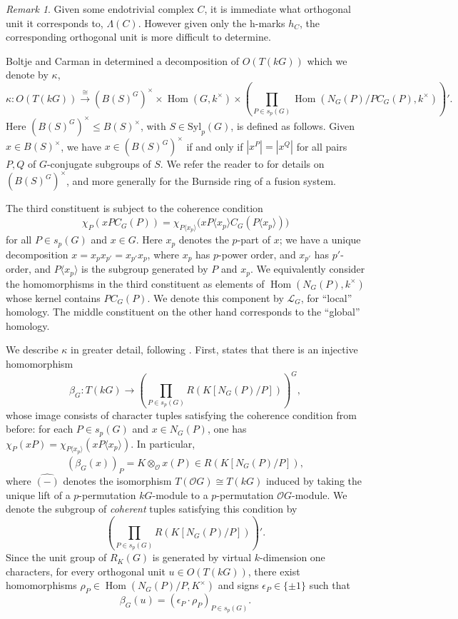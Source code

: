\documentclass[10pt,letterpaper, boxed, cm]{amsart}
\newcommand{\Hom}{\operatorname{Hom}}
\newcommand{\bigO}{\mathcal{O}}
\theoremstyle{remark}
\newtheorem{remark}[theorem]{Remark}
\theoremstyle{definition}
\begin{document}
	\begin{remark}\label{trivsourceringdecomp}
		Given some endotrivial complex $C$, it is immediate what orthogonal unit it corresponds to, $\Lambda(C)$. However given only the h-marks $h_C$, the corresponding orthogonal unit is more difficult to determine.

		Boltje and Carman in \cite{BC23} determined a decomposition of $O(T(kG))$ which we denote by $\kappa$, \[\kappa: O(T(kG)) \xrightarrow{\cong} (B(S)^G)^\times \times \Hom(G, k^\times) \times \left(\prod_{P \in s_p(G)} \Hom(N_G(P)/PC_G(P), k^\times)\right)'.\] Here $(B(S)^G)^\times \leq B(S)^\times$, with  $S \in \text{Syl}_p(G)$, is defined as follows. Given $x \in B(S)^\times$, we have $x \in (B(S)^G)^\times$ if and only if $|x^P| = |x^Q|$ for all pairs $P,Q$ of $G$-conjugate subgroups of $S$. We refer the reader to \cite{BaC19} for details on $(B(S)^G)^\times$, and more generally for the Burnside ring of a fusion system.

		The third constituent is subject to the coherence condition \[\chi_P(xPC_G(P)) = \chi_{P\langle x_p\rangle}\big(x P\langle x_p\rangle C_G(P\langle x_p\rangle)\big)\] for all $P \in s_p(G)$ and $x \in G$. Here $x_p$ denotes the $p$-part of $x$; we have a unique decomposition $x = x_px_{p'} = x_{p'}x_p$, where $x_p$ has $p$-power order, and $x_{p'}$ has $p'$-order, and $P\langle x_p\rangle$ is the subgroup generated by $P$ and $x_p$. We equivalently consider the homomorphisms in the third constituent as elements of $\Hom(N_G(P), k^\times)$ whose kernel contains $PC_G(P)$. We denote this component by $\mathcal{L}_G$, for ``local'' homology. The middle constituent on the other hand corresponds to the ``global'' homology.

		We describe $\kappa$ in greater detail, following \cite{BC23}. First, \cite[Theorem A]{BC23} states that there is an injective homomorphism \[\beta_G: T(kG) \to \left(\prod_{P \in s_p(G)} R(K[N_G(P)/P])\right)^G,\] whose image consists of character tuples satisfying the coherence condition from before: for each $P \in s_p(G)$ and $x \in N_G(P)$, one has $\chi_P(xP) = \chi_{P\langle x_p\rangle} (xP\langle x_p\rangle)$. In particular,
		\[(\beta_G(x))_P = K\otimes_\bigO \widehat{x(P)} \in R(K[N_G(P)/P]),\] where $\widehat{(-)}$ denotes the isomorphism $T(\bigO G) \cong T(kG)$ induced by taking the unique lift of a $p$-permutation $kG$-module to a $p$-permutation $\bigO G$-module. We denote the subgroup of \textit{coherent} tuples satisfying this condition by \[\left(\prod_{P \in s_p(G)} R(K[N_G(P)/P])\right)'.\]
		Since the unit group of $R_K(G)$ is generated by virtual $k$-dimension one characters, for every orthogonal unit $u\in O(T(kG))$, there exist homomorphisms $\rho_P\in \Hom(N_G(P)/P, K^\times)$ and signs $\epsilon_P \in \{\pm 1\}$ such that  \[\beta_G(u) = (\epsilon_P\cdot \rho_P)_{P \in s_p(G)}.\]


\end{remark}
\end{document}
